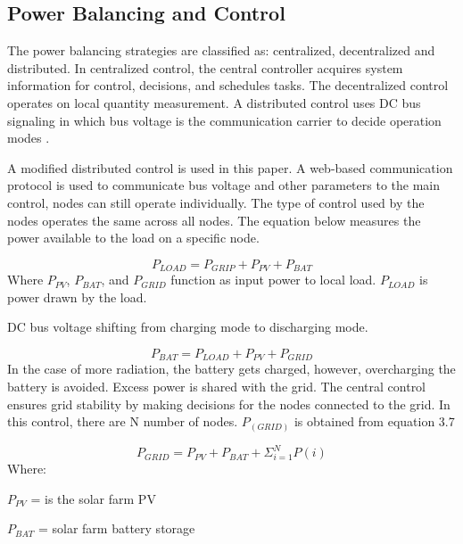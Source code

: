 \subsection{Power Balancing and Control}
The power balancing strategies are classified as: centralized, decentralized and distributed. In centralized control, the central controller acquires system information for control, decisions, and schedules tasks. The decentralized control operates on local quantity measurement. A distributed control uses DC bus signaling in which bus voltage is the communication carrier to decide operation modes \cite{38}.\par
A modified distributed control is used in this paper. A web-based communication protocol is used to communicate bus voltage and other parameters to the main control, nodes can still operate individually.
The type of control used by the nodes operates the same across all nodes. The equation below measures the power available to the load on a specific node.\par
\begin{equation}
	{P_{LOAD} = P_{GRIP}+P_{PV}+P_{BAT}}
\end{equation}
Where ${P_{PV}}$, ${P_{BAT}}$, and ${P_{GRID}}$ function as input power to local load. ${P_{LOAD}}$ is power drawn by the load.\par
DC bus voltage shifting from charging mode to discharging mode.\par
\begin{equation}
	{P_{BAT} = P_{LOAD}+P_{PV}+P_{GRID}}
\end{equation}
In the case of more radiation, the battery gets charged, however, overcharging the battery is avoided. Excess power is shared with the grid. The central control ensures grid stability by making decisions for the nodes connected to the grid. In this control, there are N number of nodes. $P_(GRID )$ is obtained from equation 3.7\par
\begin{equation}
	{P_{GRID} = P_{PV}+P_{BAT}+\Sigma^N_{i=1}P(i)}
\end{equation}
Where:
\begin{list}{}{}
	\setlength\itemsep{-1em}
	\item $P_{PV}$ = is the solar farm PV
	\item $P_{BAT}$ =  solar farm battery storage
\end{list}
